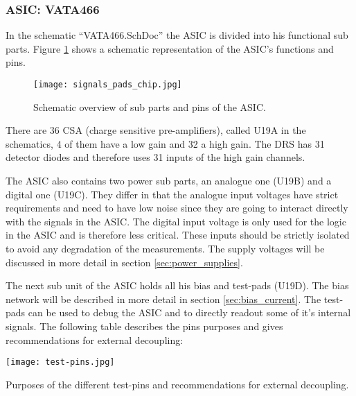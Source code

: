 \subsubsection{ASIC: VATA466}
\label{sec:asic}
In the schematic ``VATA466.SchDoc'' the ASIC is divided into his functional sub parts.
Figure \ref{fig:signals_pads} shows a schematic representation of the ASIC's functions and pins.
\begin{figure}[H]
    \centering
    \texttt{[image: signals\_pads\_chip.jpg]}
    \caption[Signals and Chip Pad Frame]{Schematic overview of sub parts and pins of the ASIC.\cite[p. 14, fig. 3]{Meier2016VATA466}}
    \label{fig:signals_pads}
\end{figure}

There are 36 CSA (charge sensitive pre-amplifiers), called U19A in the schematics, 4 of them have a low gain and 32 a high gain.
The DRS has 31 detector diodes and therefore uses 31 inputs of the high gain channels.

The ASIC also contains two power sub parts, an analogue one (U19B) and a digital one (U19C).
They differ in that the analogue input voltages have strict requirements and need to have low noise since they are going to interact directly with the signals in the ASIC.
The digital input voltage is only used for the logic in the ASIC and is therefore less critical.
These inputs should be strictly isolated to avoid any degradation of the measurements.
The supply voltages will be discussed in more detail in section \ref{sec:power_supplies}.

The next sub unit of the ASIC holds all his bias and test-pads (U19D).
The bias network will be described in more detail in section \ref{sec:bias_current}.
The test-pads can be used to debug the ASIC and to directly readout some of it's internal signals.
The following table describes the pins purposes and gives recommendations for external decoupling:
\begin{table}[H]
	\centering
    \texttt{[image: test-pins.jpg]}
    \caption[Test-pins Purpose and External Decoupling]{Purposes of the different test-pins and recommendations for external decoupling.\cite[p. 65-66, tab. 31]{Meier2016VATA466}}
	\label{tab:test-pads}
\end{table}

